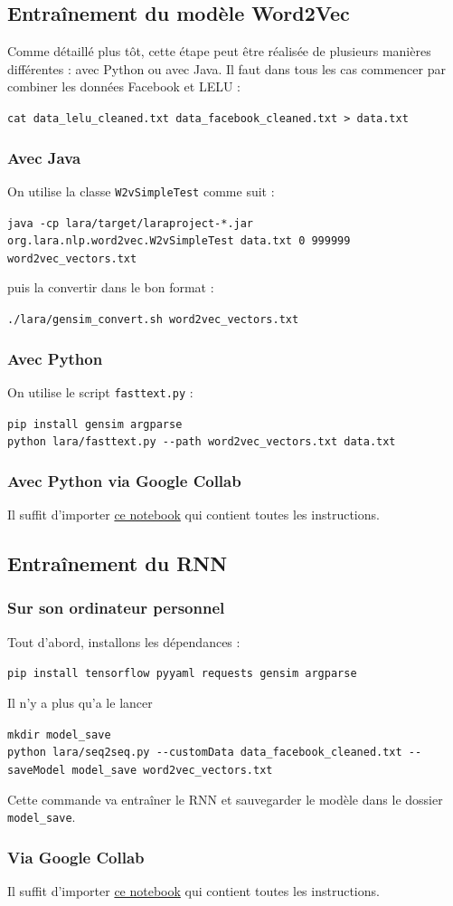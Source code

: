 \documentclass[10pt,a4paper]{article}
\begin{document}
\subsection{Entraînement du modèle Word2Vec}
Comme détaillé plus tôt, cette étape peut être réalisée de plusieurs manières différentes : avec Python ou avec Java. Il faut dans tous les cas commencer par combiner les données Facebook et LELU :
\begin{center}
\texttt{cat data\_lelu\_cleaned.txt data\_facebook\_cleaned.txt > data.txt}
\end{center}
\subsubsection{Avec Java}
On utilise la classe \texttt{W2vSimpleTest} comme suit :
\begin{center}
\texttt{java -cp lara/target/laraproject-*.jar org.lara.nlp.word2vec.W2vSimpleTest data.txt 0 999999 word2vec\_vectors.txt}
\end{center}
puis la convertir dans le bon format :
\begin{center}
\texttt{./lara/gensim\_convert.sh word2vec\_vectors.txt}
\end{center}
\subsubsection{Avec Python}
On utilise le script \texttt{fasttext.py} :
\begin{center}
\texttt{pip install gensim argparse} \\
\texttt{python lara/fasttext.py -{}-path word2vec\_vectors.txt data.txt}
\end{center}
\subsubsection{Avec Python via Google Collab}
Il suffit d'importer \href{https://github.com/LaraProject/notebooks/blob/master/LaraProject_Word2Vec.ipynb}{ce notebook} qui contient toutes les instructions.
\subsection{Entraînement du RNN}
\subsubsection{Sur son ordinateur personnel}
Tout d'abord, installons les dépendances :
\begin{center}
\texttt{pip install tensorflow pyyaml requests gensim argparse}
\end{center}
Il n'y a plus qu'a le lancer
\begin{center}
\texttt{mkdir model\_save} \\
\texttt{python lara/seq2seq.py -{}-customData data\_facebook\_cleaned.txt -{}-saveModel model\_save  word2vec\_vectors.txt} 
\end{center}
Cette commande va entraîner le RNN et sauvegarder le modèle dans le dossier \texttt{model\_save}.
\subsubsection{Via Google Collab}
Il suffit d'importer \href{https://github.com/LaraProject/notebooks/blob/master/LaraProject_RNN.ipynb}{ce notebook} qui contient toutes les instructions.
\end{document}
